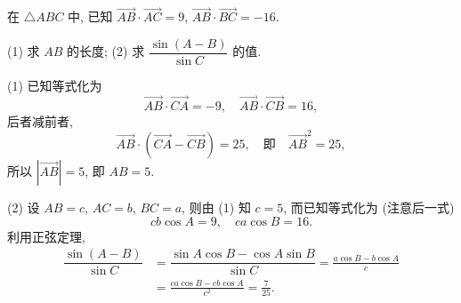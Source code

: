\begin{exercise}
    在 $\triangle ABC$ 中, 已知 $\overrightarrow{AB}\cdot \overrightarrow{AC}=9$, $\overrightarrow{AB}\cdot \overrightarrow{BC}=-16$.
    
    (1) 求 $AB$ 的长度;\qquad
    (2) 求 $\dfrac{\sin(A-B)}{\sin C}$ 的值.
\end{exercise}
\beginsolution
    (1) 已知等式化为
    \[\overrightarrow{AB}\cdot \overrightarrow{CA}= -9,\quad 
    \overrightarrow{AB}\cdot \overrightarrow{CB}= 16,\]
    后者减前者,
    \[\overrightarrow{AB}\cdot (\overrightarrow{CA}- \overrightarrow{CB})= 25,\quad\text{即}\quad
    \overrightarrow{AB}^2= 25,\]
    所以 $|\overrightarrow{AB}|= 5$, 即 $AB=5$.

    (2) 设 $AB= c$, $AC=b$, $BC=a$, 则由 (1) 知 $c=5$, 而已知等式化为 (注意后一式)
    \[cb\cos A= 9,\quad ca\cos B= 16.\]
    利用正弦定理,
    \[\begin{aligned}
        \dfrac{\sin(A-B)}{\sin C}
        &= \dfrac{\sin A\cos B- \cos A\sin B}{\sin C}
         = \frac{a\cos B- b\cos A}c\\
        &= \frac{ca\cos B- cb\cos A}{c^2}
         = \frac{7}{25}.
    \end{aligned}\]
\endsolution